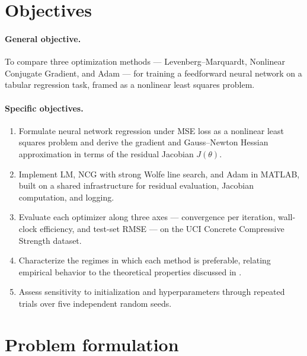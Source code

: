\documentclass[11pt,letterpaper]{article}
\theoremstyle{definition}
\begin{document}
\section{Objectives}
\label{sec:objectives}
 
\paragraph{General objective.}
To compare three optimization methods --- Levenberg--Marquardt, Nonlinear
Conjugate Gradient, and Adam --- for training a feedforward neural network
on a tabular regression task, framed as a nonlinear least squares problem.
 
\paragraph{Specific objectives.}
\begin{enumerate}
  \item Formulate neural network regression under MSE loss as a nonlinear
    least squares problem and derive the gradient and Gauss--Newton Hessian
    approximation in terms of the residual Jacobian $J(\theta)$.
  \item Implement LM, NCG with strong Wolfe line search, and Adam in
    MATLAB, built on a shared infrastructure for residual evaluation,
    Jacobian computation, and logging.
  \item Evaluate each optimizer along three axes --- convergence per
    iteration, wall-clock efficiency, and test-set RMSE --- on the UCI
    Concrete Compressive Strength dataset.
  \item Characterize the regimes in which each method is preferable,
    relating empirical behavior to the theoretical properties discussed in
    \citet[Chs.~3, 5, 10]{NocedalWright2006}.
  \item Assess sensitivity to initialization and hyperparameters through
    repeated trials over five independent random seeds.
\end{enumerate}
 
\section{Problem formulation}
\label{sec:problem}
 
\end{document}
